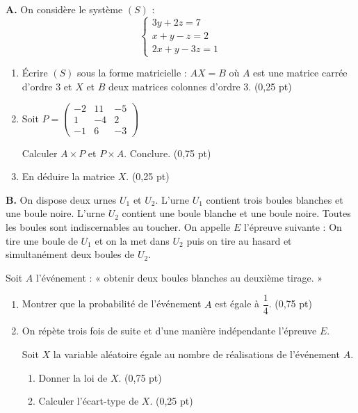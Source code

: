 




\noindent\textbf{A.} On considère le système $(S)$ :
$$
\begin{cases}
	3y + 2z = 7 \\
	x + y - z = 2 \\
	2x + y - 3z = 1
\end{cases}
$$

\begin{enumerate}
	\item Écrire $(S)$ sous la forme matricielle : $AX = B$ où $A$ est une matrice carrée d'ordre $3$ et $X$ et $B$ deux matrices colonnes d'ordre $3$. \hfill (0,25 pt)
	\item Soit $P = \begin{pmatrix} -2 & 11 & -5 \\ 1 & -4 & 2 \\ -1 & 6 & -3 \end{pmatrix}$

	Calculer $A \times P$ et $P \times A$. Conclure. \hfill (0,75 pt)
	\item En déduire la matrice $X$. \hfill (0,25 pt)
\end{enumerate}

\bigskip

\noindent\textbf{B.} On dispose deux urnes $U_1$ et $U_2$. L'urne $U_1$ contient trois boules blanches et une boule noire. L'urne $U_2$ contient une boule blanche et une boule noire. Toutes les boules sont indiscernables au toucher. On appelle $E$ l'épreuve suivante : On tire une boule de $U_1$ et on la met dans $U_2$ puis on tire au hasard et simultanément deux boules de $U_2$.

Soit $A$ l'événement : « obtenir deux boules blanches au deuxième tirage. »

\begin{enumerate}
	\item Montrer que la probabilité de l'événement $A$ est égale à $\dfrac{1}{4}$. \hfill (0,75 pt)
	\item On répète trois fois de suite et d'une manière indépendante l'épreuve $E$.

	Soit $X$ la variable aléatoire égale au nombre de réalisations de l'événement $A$.
	\begin{enumerate}
		\item Donner la loi de $X$. \hfill (0,75 pt)
		\item Calculer l'écart-type de $X$. \hfill (0,25 pt)
	\end{enumerate}
\end{enumerate}


